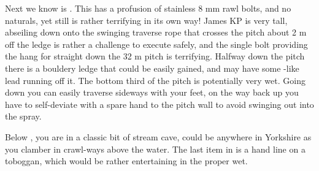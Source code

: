 Next we know is . This has a profusion of stainless 8 mm
rawl bolts, and no naturals, yet still is rather terrifying in its own
way! James KP is very tall, abseiling down onto the swinging traverse
rope that crosses the pitch about 2 m off the ledge is rather a
challenge to execute safely, and the single bolt providing the hang for
straight down the 32 m pitch is terrifying. Halfway down the pitch there
is a bouldery ledge that could be easily gained, and may have some
-like lead running off it. The bottom third of the pitch
is potentially very wet. Going down you can easily traverse sideways
with your feet, on the way back up you have to self-deviate with a spare
hand to the pitch wall to avoid swinging out into the spray.

Below , you are in a classic bit of stream cave, could be
anywhere in Yorkshire as you clamber in crawl-ways above the water. The
last item in  is a hand line on a toboggan, which would
be rather entertaining in the proper wet.



